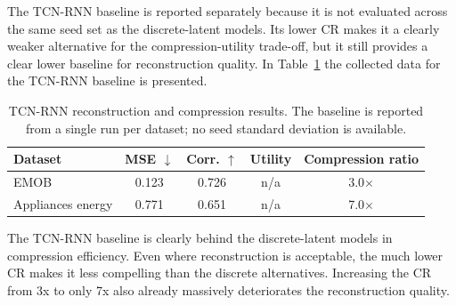 The TCN-RNN baseline is reported separately because it is not evaluated across the same seed set as the discrete-latent models. Its lower CR makes it a clearly weaker alternative for the compression-utility trade-off, but it still provides a clear lower baseline for reconstruction quality. In Table~\ref{tab:tcn-summary} the collected data for the TCN-RNN baseline is presented.

\begin{table}[htbp]
\centering
\small
\caption{TCN-RNN reconstruction and compression results. The baseline is reported from a single run per dataset; no seed standard deviation is available.}
\label{tab:tcn-summary}
\begin{tabular}{lcccc}
\toprule
\textbf{Dataset} & \textbf{MSE} $\downarrow$ & \textbf{Corr.} $\uparrow$ & \textbf{Utility} & \textbf{Compression ratio} \\
\midrule
EMOB                      & 0.123 & 0.726 & n/a & 3.0$\times$ \\
Appliances energy         & 0.771          & 0.651          & n/a & 7.0$\times$ \\
\bottomrule
\end{tabular}
\end{table}

The TCN-RNN baseline is clearly behind the discrete-latent models in compression efficiency. Even where reconstruction is acceptable, the much lower CR makes it less compelling than the discrete alternatives. Increasing the CR from 3x to only 7x also already massively deteriorates the reconstruction quality.



